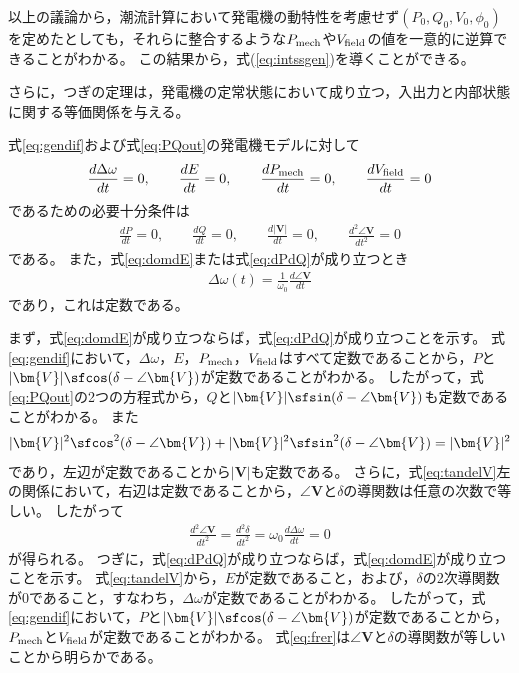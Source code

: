 \documentclass[tombow,dvipdfmx]{corona-a5-1.1}
\begin{document}
以上の議論から，潮流計算において発電機の動特性を考慮せず$(P_0,Q_0,V_0,\phi_0)$を定めたとしても，それらに整合するような$P_{\rm mech}$や$V_{\rm field}$の値を一意的に逆算できることがわかる。
この結果から，式(\ref{eq:intssgen})を導くことができる。

さらに，つぎの定理は，発電機の定常状態において成り立つ，入出力と内部状態に関する等価関係を与える。

\begin{定理}[発電機の入出力と内部状態に関する等価関係]
\label{thm:outst}
式\ref{eq:gendif}および式\ref{eq:PQout}の発電機モデルに対して
\begin{align}\label{eq:domdE}
\frac{d\Delta \omega}{dt}=0
,\qquad
\frac{dE}{dt}=0
,\qquad
\frac{d P_{\rm mech}}{dt}=0
,\qquad
\frac{d V_{\rm field}}{dt}=0
\end{align}
であるための必要十分条件は
\begin{align}\label{eq:dPdQ}
\frac{dP}{dt}=0
,\qquad
\frac{dQ}{dt}=0
,\qquad
\frac{d|\bm{V}|}{dt}=0
,\qquad
\frac{d^2 \angle \bm{V}}{dt^2}=0
\end{align}
である。
また，式\ref{eq:domdE}または式\ref{eq:dPdQ}が成り立つとき
\begin{align}\label{eq:frer}
\Delta \omega(t)= \frac{1}{\omega_0}\frac{d \angle \bm{V}}{dt}
\end{align}
であり，これは定数である。
\end{定理}

\begin{証明}
まず，式\ref{eq:domdE}が成り立つならば，式\ref{eq:dPdQ}が成り立つことを示す。
式\ref{eq:gendif}において，$\Delta \omega$，$E$，$P_{\rm mech}$，$V_{\rm field}$はすべて定数であることから，$P$と$|\bm{V}|\sfcos (\delta - \angle \bm{V})$が定数であることがわかる。
したがって，式\ref{eq:PQout}の2つの方程式から，$Q$と$|\bm{V}|\sfsin (\delta - \angle \bm{V})$も定数であることがわかる。
また
\begin{align*}
|\bm{V}|^2\sfcos^2 (\delta - \angle \bm{V}) +
|\bm{V}|^2\sfsin^2 (\delta - \angle \bm{V}) = |\bm{V}|^2
\end{align*}
であり，左辺が定数であることから$|\bm{V}|$も定数である。
さらに，式\ref{eq:tandelV}左の関係において，右辺は定数であることから，$\angle \bm{V}$と$\delta$の導関数は任意の次数で等しい。
したがって
\begin{align*}
\frac{d^2 \angle \bm{V}}{dt^2} = \frac{d^2 \delta}{dt^2} = \omega_0 \frac{d\Delta \omega}{dt} =0
\end{align*}
が得られる。
つぎに，式\ref{eq:dPdQ}が成り立つならば，式\ref{eq:domdE}が成り立つことを示す。
式\ref{eq:tandelV}から，$E$が定数であること，および，$\delta$の2次導関数が$0$であること，すなわち，$\Delta \omega$が定数であることがわかる。
したがって，式\ref{eq:gendif}において，$P$と$|\bm{V}|\sfcos (\delta - \angle \bm{V})$が定数であることから，$P_{\rm mech}$と$V_{\rm field}$が定数であることがわかる。
式\ref{eq:frer}は$\angle \bm{V}$と$\delta$の導関数が等しいことから明らかである。
\end{証明}
\end{document}
